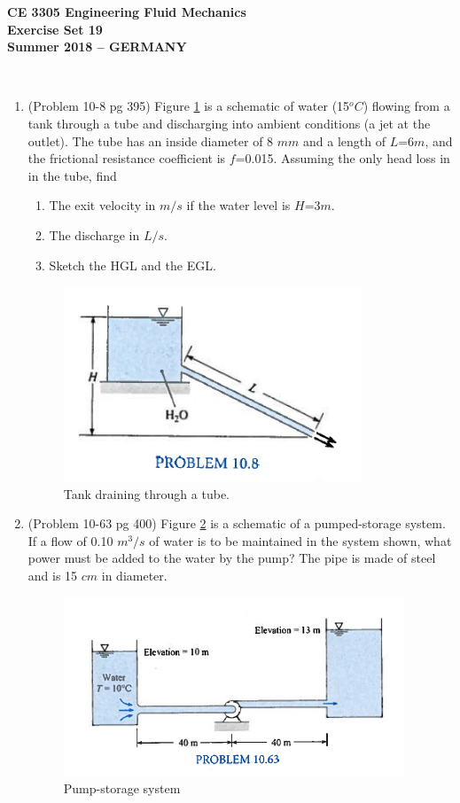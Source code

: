\documentclass[12pt]{article}
\begin{document}
\begingroup
\begin{center}
{\textbf{{ CE 3305 Engineering Fluid Mechanics} \\ Exercise Set 19 \\ Summer 2018 -- GERMANY} }
\end{center}
\endgroup
\begingroup
~\newline

\begin{enumerate}
\item (Problem 10-8 pg 395)  Figure \ref{fig:TankDrainC} is a schematic of water (15$^oC$) flowing from a tank through a tube and discharging into ambient conditions (a jet at the outlet). 
The tube has an inside diameter of 8 $mm$ and a length of $L$=6$m$, and the frictional resistance coefficient is $f$=0.015.  Assuming the only head loss in in the tube, find
\begin{enumerate}
\item The exit velocity in $m/s$ if the water level is $H$=3$m$.
\item The discharge in $L/s$.
\item Sketch the HGL and the EGL.
\end{enumerate}
\begin{figure}[htbp] %
   \centering
   \includegraphics[width=3.5in]{TankDrainC.jpg} 
   \caption{Tank draining through a tube.}
   \label{fig:TankDrainC}
\end{figure}
\clearpage

\item (Problem 10-63 pg 400) Figure \ref{fig:PumpStorageB} is a schematic of a pumped-storage system.   If a flow of 0.10 $m^3/s$ of water is to be maintained in the system shown, what power must be added to the water by the pump?  The pipe is made of steel and is 15 $cm$ in diameter.
\begin{figure}[htbp] %
   \centering
   \includegraphics[width=4in]{PumpStorageB.jpg} 
   \caption{Pump-storage system}
   \label{fig:PumpStorageB}
\end{figure}
 

\end{enumerate}
\end{document}
